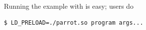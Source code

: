 






Running the example with \parrot is easy; users do
\vspace{-2 mm}
\begin{small}
\begin{verbatim}
$ LD_PRELOAD=./parrot.so program args...
\end{verbatim}
\end{small}
\vspace{-2 mm}

